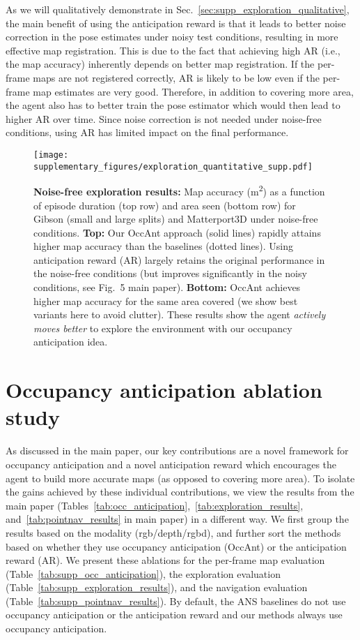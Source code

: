 \documentclass[runningheads]{llncs}
\begin{document}
As we will qualitatively demonstrate in Sec.~\ref{sec:supp_exploration_qualitative}, the main benefit of using the anticipation reward is that it leads to better noise correction in the pose estimates under noisy test conditions, resulting in more effective map registration. This is due to the fact that achieving high AR (i.e., the map accuracy) inherently depends on better map registration. If the per-frame maps are not registered correctly, AR is likely to be low even if the per-frame map estimates are very good. Therefore, in addition to covering more area, the agent also has to better train the pose estimator which would then lead to higher AR over time. Since noise correction is not needed under noise-free conditions, using AR has limited impact on the final performance.


\begin{figure}[ht]
    \centering
    \texttt{[image: supplementary\_figures/exploration\_quantitative\_supp.pdf]}
    \caption{\small\textbf{Noise-free exploration results:} Map accuracy (\si{m^2}) as a function of episode duration (top row) and area seen (bottom row) for Gibson (small and large splits) and Matterport3D under noise-free conditions. \textbf{Top:} Our OccAnt approach (solid lines) rapidly attains higher map accuracy than the baselines (dotted lines). Using anticipation reward (AR) largely retains the original performance in the noise-free conditions (but improves significantly in the noisy conditions, see Fig.~5 main paper). \textbf{Bottom:} OccAnt achieves higher map accuracy for the same area covered (we show best variants here to avoid clutter). These results show the agent \emph{actively moves better} to explore the environment with our occupancy anticipation idea.}
    \label{fig:noise_free_exploration_results}
\end{figure}


\section{Occupancy anticipation ablation study}
\label{sec:occupancy_anticipation_ablation}

As discussed in the main paper, our key contributions are a novel framework for occupancy anticipation and a novel anticipation reward which encourages the agent to build more accurate maps (as opposed to covering more area). To isolate the gains achieved by these individual contributions, we view the results from the main paper (Tables~\ref{tab:occ_anticipation},~\ref{tab:exploration_results}, and~\ref{tab:pointnav_results} in main paper) in a different way. We first group the results based on the modality (rgb/depth/rgbd), and further sort the methods based on whether they use occupancy anticipation (OccAnt) or the anticipation reward (AR).  We present these ablations for the per-frame map evaluation (Table~\ref{tab:supp_occ_anticipation}), the exploration evaluation (Table~\ref{tab:supp_exploration_results}), and the navigation evaluation (Table~\ref{tab:supp_pointnav_results}). By default, the ANS baselines do not use occupancy anticipation or the anticipation reward and our methods always use occupancy anticipation.
\end{document}
